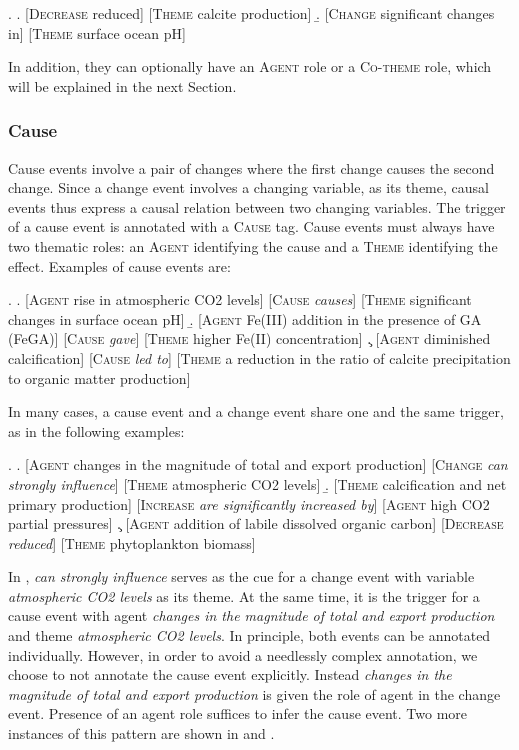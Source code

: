 \documentclass[10pt, a4paper]{article}
\newcommand{\tag}[1]{\textsc{#1}}
\begin{document}
\exi.
  \a. [\tag{Decrease} reduced] [\tag{Theme} calcite production]
  \b. [\tag{Change} significant changes in] [\tag{Theme} surface ocean pH]

In addition, they can optionally have an \tag{Agent} role or a \tag{Co-theme} role, which will be explained in the next Section.


\subsubsection{Cause}

Cause events involve a pair of changes where the first change causes the second change.
Since a change event involves a changing variable, as its theme, causal events thus express a causal relation between two changing variables. 
The trigger of a cause event is annotated with a \tag{Cause} tag. 
Cause events must always have two thematic roles: an \tag{Agent} identifying the cause and a \tag{Theme} identifying the effect. 
Examples of cause events are:

\exi.
  \a. [\tag{Agent} rise in atmospheric CO2 levels] [\tag{Cause} \emph{causes}] [\tag{Theme} significant changes in surface ocean pH]
  \b. [\tag{Agent} Fe(III) addition in the presence of GA (FeGA)] [\tag{Cause} \emph{gave}] [\tag{Theme} higher Fe(II) concentration]
  \c. [\tag{Agent} diminished calcification] [\tag{Cause} \emph{led to}] [\tag{Theme} a reduction in the ratio of calcite precipitation to organic matter production]

In many cases, a cause event and a change event share one and the same trigger, as in the following examples:

\exi.
  \a. [\tag{Agent} changes in the magnitude of total and export production] [\tag{Change} \emph{can strongly influence}] [\tag{Theme} atmospheric CO2 levels]
  \b. [\tag{Theme} calcification and net primary production] [\tag{Increase} \emph{ are significantly increased by}] [\tag{Agent} high CO2 partial pressures]
  \c. [\tag{Agent} addition of labile dissolved organic carbon] [\tag{Decrease}  \emph{reduced}] [\tag{Theme} phytoplankton biomass]

In \Last[a], \emph{can strongly influence} serves as the cue for a change event with variable \emph{atmospheric CO2 levels} as its theme. 
At the same time, it is the trigger for a cause event with agent \emph{ changes in the magnitude of total and export production} and theme \emph{atmospheric CO2 levels}.
In principle, both events can be annotated individually.  
However, in order to avoid a needlessly complex annotation, we choose to not annotate the cause event explicitly. 
Instead \emph{changes in the magnitude of total and export production} is given the role of agent in the change event. 
Presence of an agent role suffices to infer the cause event.
Two more instances of this pattern are shown in \Last[b] and \Last[c].
\end{document}

